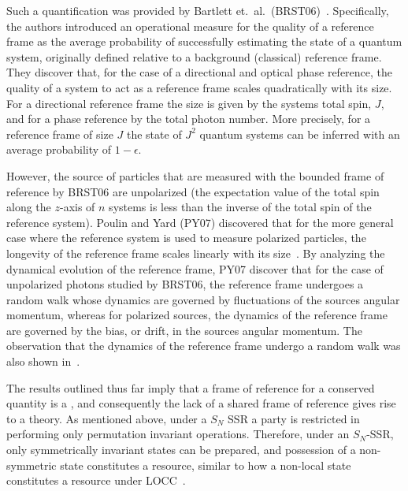 Such a quantification was provided by Bartlett et.~al.~(BRST06)~\cite{BRST06}. Specifically, the authors introduced an operational measure for the quality of a reference frame as the average probability of successfully estimating the state of a quantum system, originally defined relative to a background (classical) reference frame.  They discover that, for the case of a directional and optical phase reference, the quality of a system to act as a reference frame scales quadratically with its size.   For a directional reference frame the size is given by the systems total spin, $J$, and for a phase reference by the total photon number.  More precisely, for a reference frame of size $J$ the state of $J^2$ quantum systems can be inferred with an average probability of $1-\epsilon$.

However, the source of particles that are measured with the bounded frame of reference by BRST06 are unpolarized (the expectation value of the total spin along the $z$-axis of $n$ systems is less than the inverse of the total spin of the reference system).   Poulin and Yard (PY07) discovered that for the more general case where the reference system is used to measure  polarized particles, the longevity of the reference frame scales linearly with its size~\cite{PY07}.  By analyzing the dynamical evolution of the reference frame, PY07 discover that for the case of unpolarized photons studied by BRST06, the reference frame undergoes a random walk whose dynamics are governed by fluctuations of the sources angular momentum, whereas for polarized sources, the dynamics of the reference frame are governed by the bias, or drift, in the sources angular momentum.  The observation that the dynamics of the reference frame undergo a random walk was also shown in~\cite{BRST07}.

The results outlined thus far imply that a frame of reference for a conserved quantity is a , and consequently the lack of a shared frame of reference gives rise to a  theory.  As mentioned above, under a $S_N$ SSR a party is restricted in performing only permutation invariant operations. Therefore, under an $S_N$-SSR, only symmetrically invariant states can be prepared, and possession of a non-symmetric state constitutes a resource, similar to how a non-local state constitutes a resource under LOCC~\cite{N99}.  

